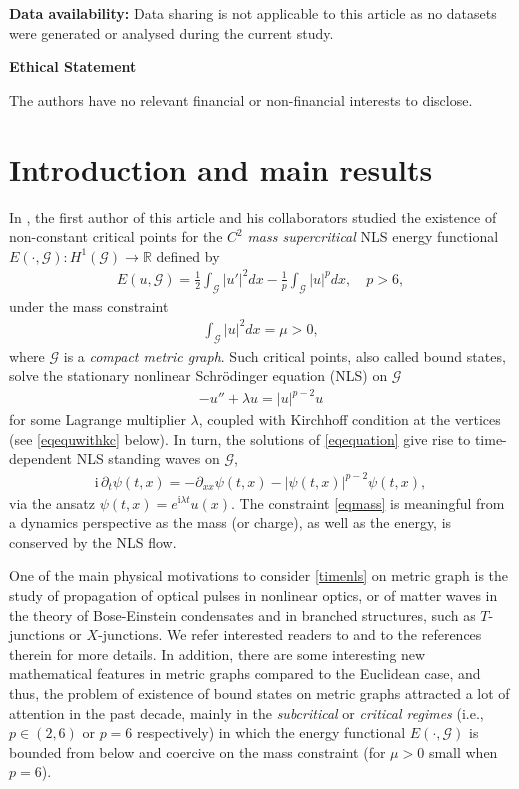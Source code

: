 \documentclass[10pt,a4paper]{article}
\theoremstyle{definition} \theoremstyle{remark}
\numberwithin{equation}{section}
\newcommand{\G}{\mathcal{G}}
\newcommand{\R}{\mathbb{R}}
\newcommand{\la}{\lambda}
\begin{document}
\medskip
{\small \noindent \textbf{Data availability:} Data sharing is not applicable to this article as no datasets were generated or analysed during the current study.}

\medskip
{\small \noindent \textbf{Ethical Statement}
	
\noindent {} The authors have no relevant financial or non-financial interests to disclose.}

\section{Introduction and main results}

In \cite{CJS}, the first author of this article and his collaborators studied the existence of non-constant critical points for the $C^2$ \emph{mass supercritical} NLS energy functional $E(\cdot,\G): H^1(\G) \to \R$ defined by
\begin{align} \label{eqnerf}
	E(u,\G) = \frac12 \int_\G|u'|^2dx - \frac1p \int_\G|u|^pdx, \quad p > 6,
\end{align}
under the mass constraint
\begin{align} \label{eqmass}
	\int_\G|u|^2dx = \mu > 0,
\end{align}
where $\G$ is a \emph{compact metric graph}. Such critical points, also called bound states, solve the stationary nonlinear Schr\"odinger equation (NLS) on $\G$
\begin{align} \label{eqequation}
	-u'' + \la u = |u|^{p-2}u
\end{align}
for some Lagrange multiplier $\la$, coupled with Kirchhoff condition at the vertices (see \eqref{eqequwithkc} below). In turn, the solutions of \eqref{eqequation} give rise to time-dependent NLS standing waves on $\G$,
\begin{align} \label{timenls}
\mathrm{i}\, \partial_t \psi(t,x)
= -\partial_{xx} \psi(t,x)-|\psi(t,x)|^{p-2} \psi(t,x),
\end{align}
via the ansatz $\psi(t,x) = e^{\mathrm{i} \lambda t}u(x)$. The constraint \eqref{eqmass} is meaningful from a dynamics perspective as the mass (or charge), as well as the energy, is conserved by the NLS flow.

One of the main physical motivations to consider \eqref{timenls} on metric graph is the study of propagation of optical pulses in nonlinear optics, or of matter waves in the theory of Bose-Einstein condensates and in branched structures, such as $T$-junctions or $X$-junctions. We refer interested readers to \cite{AST3, BK, KNP, LLMetc, Noja} and to the references therein for more details. 
In addition, there are some interesting new mathematical features in metric graphs compared to the Euclidean case, and thus, the problem of existence of bound states on metric graphs attracted a lot of attention in the past decade, mainly in the \emph{subcritical} or \emph{critical regimes} (i.e., $p \in (2,6)$ or $p = 6$ respectively) in which the energy functional $E(\cdot,\G)$ is bounded from below and coercive on the mass constraint (for $\mu >0$ small when $p=6$). 
\end{document}
